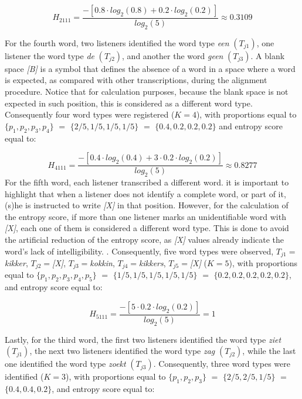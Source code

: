 \documentclass[
  authoryear,
  preprint,
  1p]{elsarticle}
\begin{document}
\[ 
H_{2111} = \frac{ -\left[ 0.8 \cdot log_{2}(0.8) + 0.2 \cdot log_{2}(0.2) \right] }{ log_{2}(5)} \approx 0.3109
\]

{For the fourth word,} two listeners identified the word type \emph{een}
\((T_{j1})\), one listener the word type \emph{de} \((T_{j2})\), and
another the word \emph{geen} \((T_{j3})\). A blank space \emph{{[}B{]}}
is a symbol that defines the absence of a word in a space where a word
is expected, as compared with other transcriptions, during the alignment
procedure. Notice that for calculation purposes, because the blank space
is not expected in such position, this is considered as a different word
type. Consequently four word types were registered (\(K=4\)), with
proportions equal to \(\{ p_{1}, p_{2}, p_{3}, p_{4} \}\) \(=\)
\(\{ 2/5, 1/5, 1/5, 1/5 \}\) \(=\) \(\{ 0.4, 0.2, 0.2, 0.2 \}\) and
entropy score equal to:

\[ 
H_{4111} = \frac{ -\left[ 0.4 \cdot log_{2}(0.4) + 3 \cdot 0.2 \cdot log_{2}(0.2) \right] }{ log_{2}(5)} \approx 0.8277
\] {For the fifth word,} each listener transcribed a different word. it
is important to highlight that when a listener does not identify a
complete word, or part of it, (s)he is instructed to write
\emph{{[}X{]}} in that position. However, for the calculation of the
entropy score, if more than one listener marks an unidentifiable word
with \emph{{[}X{]}}, each one of them is considered a different word
type. This is done to avoid the artificial reduction of the entropy
score, as \emph{{[}X{]}} values already indicate the word's lack of
intelligibility. . Consequently, five word types were observed,
\(T_{j1}=\)\emph{kikker}, \(T_{j2}=\)\emph{{[}X{]}},
\(T_{j3}=\)\emph{kokkin}, \(T_{j4}=\)\emph{kikkers},
\(T_{j5}=\)\emph{{[}X{]}} (\(K=5\)), with proportions equal to
\(\{ p_{1}, p_{2}, p_{3}, p_{4}, p_{5} \}\) \(=\)
\(\{ 1/5, 1/5, 1/5, 1/5, 1/5 \}\) \(=\)
\(\{ 0.2, 0.2, 0.2, 0.2, 0.2 \}\), and entropy score equal to:

\[ 
H_{5111} = \frac{ -\left[ 5 \cdot 0.2 \cdot log_{2}(0.2) \right] }{ log_{2}(5)} = 1
\]

{Lastly, for the third word, the first two listeners identified the word
type \emph{ziet} \((T_{j1})\), the next two listeners identified the
word type \emph{zag} \((T_{j2})\), while the last one identified the
word type \emph{zoekt} \((T_{j3})\). Consequently, three word types were
identified (\(K=3\)), with proportions equal to
\(\{ p_{1}, p_{2}, p_{3} \}\) \(=\) \(\{ 2/5, 2/5, 1/5 \}\) \(=\)
\(\{ 0.4, 0.4, 0.2 \}\), and entropy score equal to:}
\end{document}

